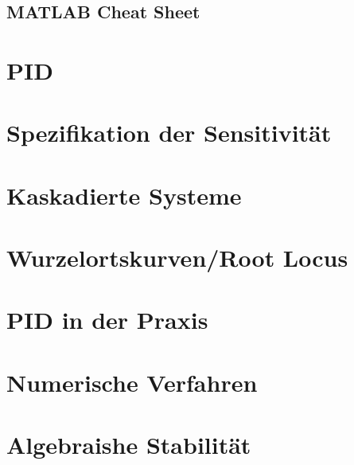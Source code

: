 \begin{multicols*}{2}
\section{MATLAB Cheat Sheet}
        

\end{multicols*}
\begin{multicols*}{3}
\section{PID}
    

\section{Spezifikation der Sensitivität}
    
    

\vfill\null\columnbreak    
\section{Kaskadierte Systeme}
    

\section{Wurzelortskurven/Root Locus}
    

\vfill\null\columnbreak 
\section{PID in der Praxis}
    
    
    
    
\section{Numerische Verfahren}
    
    
\vfill\null\columnbreak
\section{Algebraishe Stabilität}
    
    


\end{multicols*}
